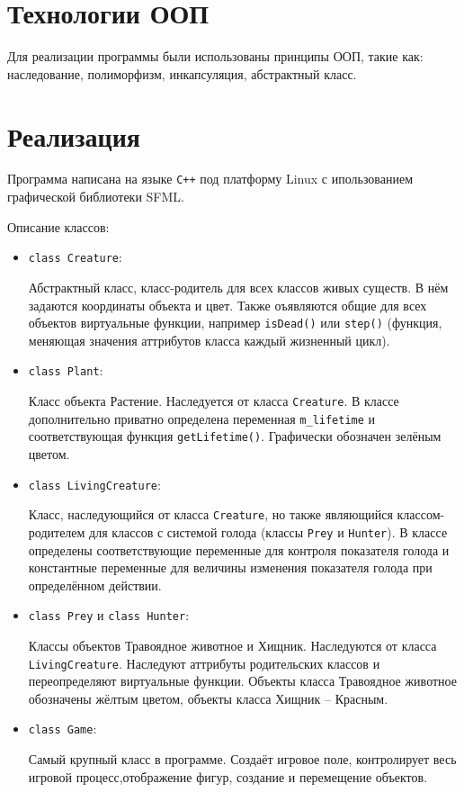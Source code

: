 \documentclass[fleqn]{article}
\begin{document}
\section{Технологии ООП}

Для реализации программы были использованы принципы ООП, такие как: наследование, полиморфизм, инкапсуляция, абстрактный класс.

\section{Реализация}

Программа написана на языке \verb"С++" под платформу Linux с ипользованием графической библиотеки SFML.

Описание классов:
\begin{itemize}
		\item \verb"class Creature":

			Абстрактный класс, класс-родитель для всех классов живых существ.
			В нём задаются координаты объекта и цвет.
			Также оъявляются общие для всех объектов виртуальные функции, например \verb"isDead()" или \verb"step()" (функция, меняющая значения аттрибутов класса каждый жизненный цикл).

		\item \verb"class Plant":

			Класс объекта Растение. Наследуется от класса \verb"Creature". В классе дополнительно приватно определена переменная \verb"m_lifetime" и соответствующая функция \verb"getLifetime()". Графически обозначен зелёным цветом.

		\item \verb"class LivingCreature":

			Класс, наследующийся от класса \verb"Creature", но также являющийся классом-родителем для классов с системой голода (классы \verb"Prey" и \verb"Hunter").
			В классе определены соответствующие переменные для контроля 
			показателя голода и константные переменные для величины 
			изменения показателя голода при определённом действии. 

		\item \verb"class Prey" и \verb"class Hunter":

			Классы объектов Травоядное животное и Хищник. 
			Наследуются от класса \verb"LivingCreature".
			Наследуют аттрибуты родительских классов и переопределяют виртуальные функции.
			Объекты класса Травоядное животное обозначены жёлтым цветом, объекты класса Хищник -- Красным.

		\item \verb"class Game":

			Самый крупный класс в программе.
			Создаёт игровое поле, контролирует весь игровой процесс,отображение фигур, создание и перемещение объектов.

\end{itemize}
\end{document}
